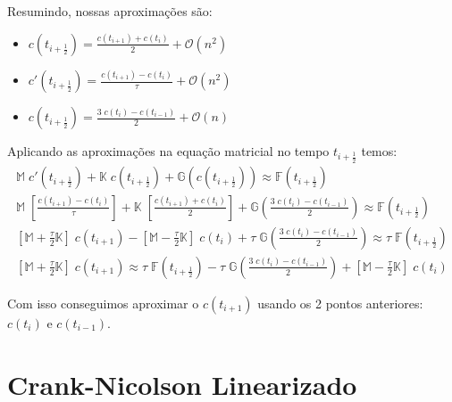 \documentclass[a4paper]{article}
\begin{document}
Resumindo, nossas aproximações são:
\begin{itemize}
\item \(
    c(t_{i+\frac12})
    =
    \frac{c(t_{i+1}) + c(t_i)}{2}
    + \mathcal{O}(n^2)
\)
\item \(
    c'(t_{i+\frac12})
    =
    \frac{c(t_{i+1}) - c(t_i)}{\tau}
    + \mathcal{O}(n^2)
\)
\item \(
    c(t_{i+\frac12})
    =
    \frac{3 \; c(t_i) - c(t_{i-1})}{2}
    + \mathcal{O}(n)
\)
\end{itemize}

Aplicando as aproximações na equação matricial
no tempo \(t_{i+\frac12}\)
temos:
\[ \begin{array}{l} \displaystyle
    \mathbb{M} \; c'(t_{i+\frac12})
    + \mathbb{K} \; c(t_{i+\frac12})
    + \mathbb{G}(c(t_{i+\frac12}))
    \approx \mathbb{F}\left( t_{i+\frac12} \right)
    \\[3ex] \displaystyle
    \mathbb{M} \; \left[ \frac{c(t_{i+1}) - c(t_i)}{\tau} \right]
    + \mathbb{K} \; \left[ \frac{c(t_{i+1}) + c(t_i)}{2} \right]
    + \mathbb{G}\left( \frac{3 \; c(t_i) - c(t_{i-1})}{2} \right)
    \approx \mathbb{F}\left( t_{i+\frac12} \right)
    \\[3ex] \displaystyle
    \left[ \mathbb{M} + \frac\tau2 \mathbb{K} \right] \; c(t_{i+1})
    - \left[ \mathbb{M} - \frac\tau2 \mathbb{K} \right] \; c(t_i)
    + \tau \; \mathbb{G}\left( \frac{3 \; c(t_i) - c(t_{i-1})}{2} \right)
    \approx \tau \; \mathbb{F}\left( t_{i+\frac12} \right)
    \\[3ex] \displaystyle
    \left[ \mathbb{M} + \frac\tau2 \mathbb{K} \right] \; c(t_{i+1})
    \approx \tau \; \mathbb{F}\left( t_{i+\frac12} \right)
    - \tau \; \mathbb{G}\left( \frac{3 \; c(t_i) - c(t_{i-1})}{2} \right)
    + \left[ \mathbb{M} - \frac\tau2 \mathbb{K} \right] \; c(t_i)
\end{array} \]

Com isso conseguimos aproximar o
\(c(t_{i+1})\) usando os 2 pontos anteriores:
\(c(t_i)\) e \(c(t_{i-1})\).

\section{Crank-Nicolson Linearizado}
\end{document}

